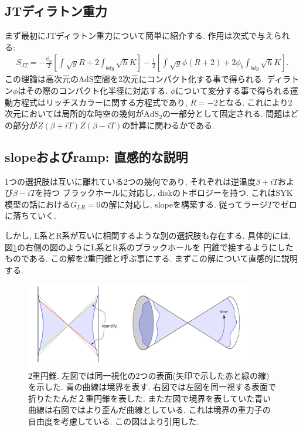 \subsection{JTディラトン重力}
まず最初にJTディラトン重力について簡単に紹介する. 
作用は次式で与えられる:
\begin{align}
	S_{JT} = -\frac{\phi_0}{2}\left[\int \sqrt{g}R + 2\int_{bdy}\sqrt{h}K \right]
			-\frac{1}{2}\left[
				\int \sqrt{g}\phi(R+2) + 2\phi_b\int_{bdy}\sqrt{h}K
			\right].
	\label{eq:JTgravity}
\end{align}
この理論は高次元のAdS空間を2次元にコンパクト化する事で得られる. 
ディラトン$\phi$はその際のコンパクト化半径に対応する. 
$\phi$について変分する事で得られる運動方程式はリッチスカラーに関する方程式であり, $R = -2$となる. 
これにより2次元においては局所的な時空の幾何が$\mathrm{AdS}_2$の一部分として固定される. 
問題はどの部分が$Z(\beta + iT)Z(\beta - iT)$の計算に関わるかである. 

\subsection{slopeおよびramp: 直感的な説明}
1つの選択肢は互いに離れている2つの幾何であり, それぞれは逆温度$\beta + iT$および$\beta - iT$を持つ
ブラックホールに対応し, diskのトポロジーを持つ. 
これはSYK模型の話における$G_{LR} = 0$の解に対応し, slopeを構築する. 
従ってラージ$T$でゼロに落ちていく. 

しかし, L系とR系が互いに相関するような別の選択肢も存在する. 
具体的には, 図\ref{fig:double_cone}の右側の図のようにL系とR系のブラックホールを
円錐で接するようにしたものである. この解を2重円錐と呼ぶ事にする. 
まずこの解について直感的に説明する. 

\begin{figure}[ht]
	\centering
	\includegraphics[width=10cm]{figures/double_cone}
	\caption{
	2重円錐. 左図では同一視化の2つの表面(矢印で示した赤と緑の線)を示した. 
	青の曲線は境界を表す. 
	右図では左図を同一視する表面で折りたたんだ２重円錐を表した. 
	また左図で境界を表していた青い曲線は右図ではより歪んだ曲線としている. 
	これは境界の重力子の自由度を考慮している. 
	この図は\cite{stanford_chaos}より引用した. }
	\label{fig:double_cone}
\end{figure}

